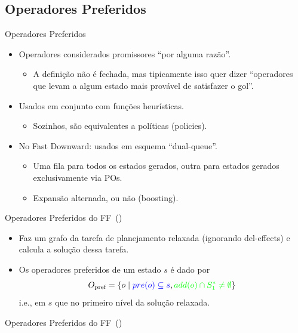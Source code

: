 \documentclass{beamer}
\begin{document}
\subsection{Operadores Preferidos}
\begin{frame}{Operadores Preferidos}
\begin{itemize}
\item \alert{Operadores} considerados \alert{promissores} ``por alguma razão''.
    \pause
  \begin{itemize}
  \item A definição não é fechada, mas tipicamente isso quer dizer ``operadores que levam a algum estado mais provável de satisfazer o gol''. %
  \end{itemize}
  \pause
\item Usados em conjunto com funções heurísticas.
  \begin{itemize}
  \item Sozinhos, são equivalentes a políticas (policies).
  \end{itemize}
\pause
\item No Fast Downward: usados em esquema ``\alert{dual-queue}''.
  \begin{itemize}
  \item Uma fila para todos os estados gerados, outra para \alert{estados gerados exclusivamente via POs}.
  \item Expansão alternada, ou não (\alert{boosting}).
  \end{itemize}
\end{itemize}
\end{frame}

\begin{frame}{Operadores Preferidos do FF~(\cite{Hoffmann.Nebel/2001})}
\begin{itemize}
\item Faz um grafo da tarefa de planejamento \alert{relaxada} (ignorando del-effects) e calcula a solução dessa tarefa.
\pause
\item Os operadores preferidos de um estado $s$ é dado por $$O_{\text{pref}} = \{o \mid {\color{blue} pre(o) \subseteq s}, {\color{green} add(o) \cap S_{1}^{*} \neq \emptyset} \}$$
i.e.,  em $s$ que  no primeiro nível da solução relaxada.
\end{itemize}
\end{frame}

\begin{frame}{Operadores Preferidos do FF~(\cite{Hoffmann.Nebel/2001})}
\end{frame}
\end{document}
